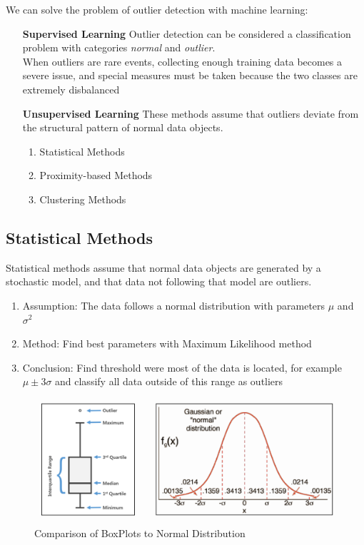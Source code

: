 \documentclass[11pt]{article}
\begin{document}
We can solve the problem of outlier detection with machine learning:

\begin{itemize}[leftmargin=*, labelindent=5cm, labelsep=0.5cm]
    \item[\textbf{Supervised Learning}] Outlier detection can be considered a classification problem with categories \emph{normal} and \emph{outlier}.\\
          When outliers are rare events, collecting enough training data becomes a severe issue, and special measures must be taken because the two classes are extremely disbalanced
    \item[\textbf{Unsupervised Learning}] These methods assume that outliers deviate from the structural pattern of normal data objects.
          \begin{enumerate}
              \item Statistical Methods
              \item Proximity-based Methods
              \item Clustering Methods
          \end{enumerate}
\end{itemize}

\subsection{Statistical Methods}
Statistical methods assume that normal data objects are generated by a stochastic model, and that data not following that model are outliers.

\begin{enumerate}
    \item Assumption: The data follows a normal distribution with parameters $\mu$ and $\sigma^2$
    \item Method: Find best parameters with Maximum Likelihood method
    \item Conclusion: Find threshold were most of the data is located, for example $\mu \pm 3\sigma$ and classify all data outside of this range as outliers
\end{enumerate}

\begin{figure}[tbh!]
    \centering
    \includegraphics[width=0.8\linewidth, keepaspectratio]{Pictures/outlier_boxplot}
    \caption{Comparison of BoxPlots to Normal Distribution}
    \label{fig:outlierboxplot}
\end{figure}
\end{document}
